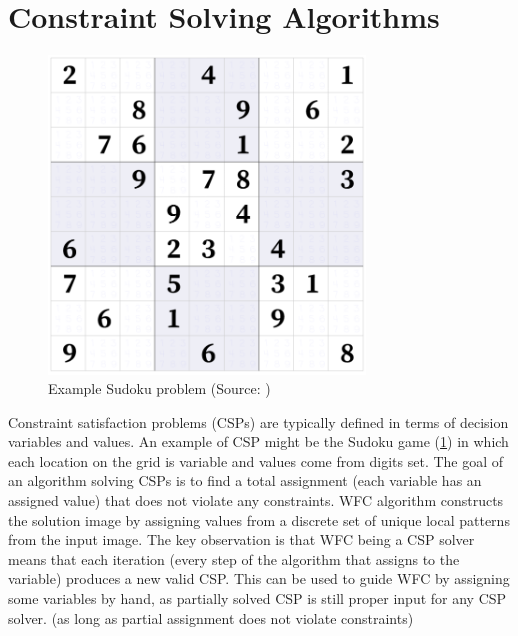 \documentclass[shortabstract, english, inz]{iithesis}
\begin{document}
\section{Constraint Solving Algorithms}
\begin{figure}[H]
\centering
\includegraphics[width=0.75\textwidth, angle=0]{images/sudoku.png}
\caption{Example Sudoku problem (Source: \cite{sudoku})}
\label{fig:sudoku}
\end{figure}
Constraint satisfaction problems (CSPs) are typically defined in terms of decision variables and values. An example of CSP might be the Sudoku game (\ref{fig:sudoku}) in which each location on the grid is variable and values come from digits set. The goal of an algorithm solving CSPs is to find a total assignment (each variable has an assigned value) that does not violate any constraints. \fmlinebreak
WFC algorithm constructs the solution image by assigning values from a discrete set of unique local patterns from the input image. \cite{Smith} The key observation is that WFC being a CSP solver means that each iteration (every step of the algorithm that assigns to the variable) produces a new valid CSP. This can be used to guide WFC by assigning some variables by hand, as partially solved CSP is still proper input for any CSP solver. (as long as partial assignment does not violate constraints)
\end{document}
